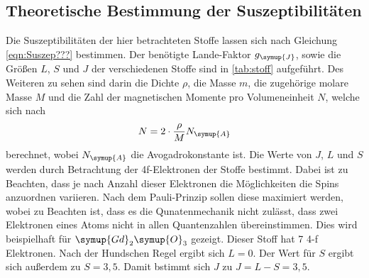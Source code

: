     \subsection{Theoretische Bestimmung der Suszeptibilitäten}
    Die Suszeptibilitäten der hier betrachteten Stoffe lassen sich nach Gleichung \eqref{eqn:Suszep???} bestimmen.
    Der benötigte Lande-Faktor $g_{\symup{J}}$, sowie die Größen $L$, $S$ und $J$ der verschiedenen Stoffe sind in \autoref{tab:stoff}
    aufgeführt. Des Weiteren zu sehen sind darin die Dichte $\rho$, die Masse $m$, die zugehörige molare Masse $M$ und die Zahl der magnetischen
    Momente pro Volumeneinheit $N$, welche sich nach 
    \begin{equation}
    \label{eqn:N}
        N = 2 \cdot \frac{\rho}{M} N_{\symup{A}}
    \end{equation}
    berechnet, wobei $N_{\symup{A}}$ die Avogadrokonstante ist. Die Werte von $J$, $L$ und $S$ werden durch Betrachtung der 4f-Elektronen 
    der Stoffe bestimmt. Dabei ist zu Beachten, dass je nach Anzahl dieser Elektronen die Möglichkeiten die Spins anzuordnen variieren.
    Nach dem Pauli-Prinzip sollen diese maximiert werden, wobei zu Beachten ist, dass es die Qunatenmechanik nicht zulässt, dass zwei 
    Elektronen eines Atoms nicht in allen Quantenzahlen übereinstimmen. Dies wird beispielhaft für $\symup{Gd}_2\symup{O}_3$ gezeigt.
    Dieser Stoff hat 7 4-f Elektronen. Nach der Hundschen Regel ergibt sich $L = 0$. Der Wert für $S$ ergibt sich außerdem zu 
    $S = 3,5$. Damit bstimmt sich $J$ zu $J = L - S = 3,5$. 